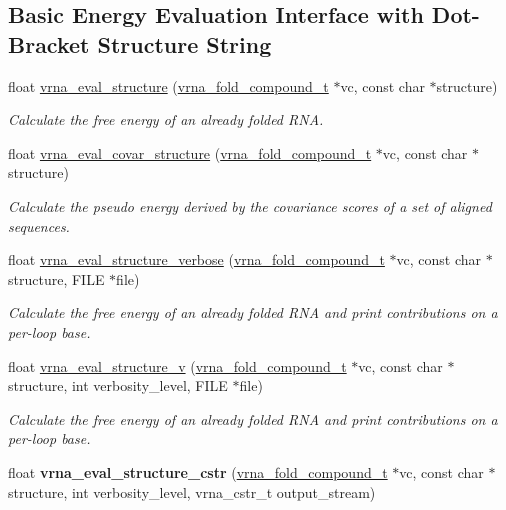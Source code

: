 \subsection*{Basic Energy Evaluation Interface with Dot-\/\+Bracket Structure String}
\begin{DoxyCompactItemize}
\item 
float \hyperlink{group__eval_ga58f199f1438d794a265f3b27fc8ea631}{vrna\+\_\+eval\+\_\+structure} (\hyperlink{group__fold__compound_ga1b0cef17fd40466cef5968eaeeff6166}{vrna\+\_\+fold\+\_\+compound\+\_\+t} $\ast$vc, const char $\ast$structure)
\begin{DoxyCompactList}\small\item\em Calculate the free energy of an already folded R\+NA. \end{DoxyCompactList}\item 
float \hyperlink{group__eval_ga6cea75c0eb9857fb59172be54cab09e0}{vrna\+\_\+eval\+\_\+covar\+\_\+structure} (\hyperlink{group__fold__compound_ga1b0cef17fd40466cef5968eaeeff6166}{vrna\+\_\+fold\+\_\+compound\+\_\+t} $\ast$vc, const char $\ast$structure)
\begin{DoxyCompactList}\small\item\em Calculate the pseudo energy derived by the covariance scores of a set of aligned sequences. \end{DoxyCompactList}\item 
float \hyperlink{group__eval_ga0928d699d310178f84ee2351034e5cb5}{vrna\+\_\+eval\+\_\+structure\+\_\+verbose} (\hyperlink{group__fold__compound_ga1b0cef17fd40466cef5968eaeeff6166}{vrna\+\_\+fold\+\_\+compound\+\_\+t} $\ast$vc, const char $\ast$structure, F\+I\+LE $\ast$file)
\begin{DoxyCompactList}\small\item\em Calculate the free energy of an already folded R\+NA and print contributions on a per-\/loop base. \end{DoxyCompactList}\item 
float \hyperlink{group__eval_gab12e6b1226227670322150df018734f8}{vrna\+\_\+eval\+\_\+structure\+\_\+v} (\hyperlink{group__fold__compound_ga1b0cef17fd40466cef5968eaeeff6166}{vrna\+\_\+fold\+\_\+compound\+\_\+t} $\ast$vc, const char $\ast$structure, int verbosity\+\_\+level, F\+I\+LE $\ast$file)
\begin{DoxyCompactList}\small\item\em Calculate the free energy of an already folded R\+NA and print contributions on a per-\/loop base. \end{DoxyCompactList}\item 
\mbox{\label{group__eval_ga1d49318a535422b723e2c47520ac090a}} 
float {\bfseries vrna\+\_\+eval\+\_\+structure\+\_\+cstr} (\hyperlink{group__fold__compound_ga1b0cef17fd40466cef5968eaeeff6166}{vrna\+\_\+fold\+\_\+compound\+\_\+t} $\ast$vc, const char $\ast$structure, int verbosity\+\_\+level, vrna\+\_\+cstr\+\_\+t output\+\_\+stream)
\end{DoxyCompactItemize}
